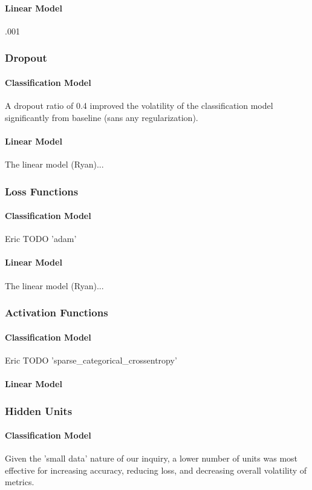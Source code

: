 \documentclass{article}
\begin{document}
\begin{multicols}{2}
\paragraph{Linear Model}
.001
\subsubsection{Dropout}
\paragraph{Classification Model}
A dropout ratio of 0.4 improved the volatility of the classification model significantly from baseline (sans any regularization).
\paragraph{Linear Model}
The linear model (Ryan)...
\subsubsection{Loss Functions}
\paragraph{Classification Model}
Eric TODO 'adam'
\paragraph{Linear Model}
The linear model (Ryan)...
\subsubsection{Activation Functions}
\paragraph{Classification Model}
Eric TODO 'sparse_categorical_crossentropy'
\paragraph{Linear Model}
\subsubsection{Hidden Units}
\paragraph{Classification Model}
Given the 'small data' nature of our inquiry, a lower number of units was most effective for increasing accuracy, reducing loss, and decreasing overall volatility of metrics.

\end{multicols}
\end{document}

